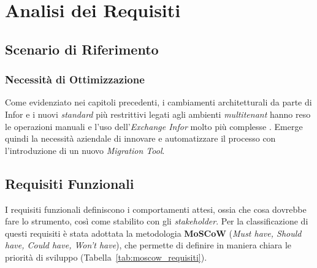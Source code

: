 ﻿\chapter{Analisi dei Requisiti}

\section{Scenario di Riferimento}
\subsection{Necessità di Ottimizzazione}
Come evidenziato nei capitoli precedenti, i cambiamenti architetturali da parte di Infor e i 
nuovi \textit{standard} più restrittivi legati agli ambienti \textit{multitenant} hanno reso le 
operazioni manuali e l'uso dell'\textit{Exchange Infor} molto più complesse \cite{erpMigration}. 
Emerge quindi la necessità aziendale di innovare e automatizzare il processo con l'introduzione di un nuovo \textit{Migration Tool}.

\section{Requisiti Funzionali}
I requisiti funzionali definiscono i comportamenti attesi, ossia che cosa dovrebbe fare lo strumento, così come stabilito con gli \textit{stakeholder}. 
Per la classificazione di questi requisiti è stata adottata la metodologia \textbf{MoSCoW} (\textit{Must have, Should have, Could have, Won't have}), che permette di definire in maniera 
chiara le priorità di sviluppo (Tabella~\ref{tab:moscow_requisiti}).

